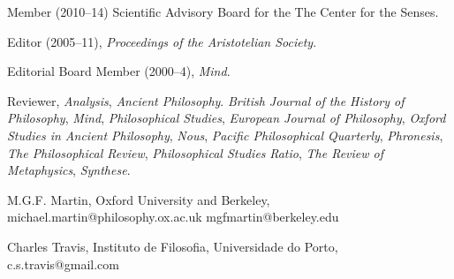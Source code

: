 \documentclass[11pt]{article}
\begin{document}
\ind Member (2010--14) Scientific Advisory Board for the The Center for the Senses.

\ind Editor (2005--11), \emph{Proceedings of the Aristotelian Society}.

\ind Editorial Board Member (2000--4), \emph{Mind}. 

\ind Reviewer, \emph{Analysis}, \emph{Ancient Philosophy}. \emph{British Journal of the History of Philosophy}, \emph{Mind}, \emph{Philosophical Studies}, \emph{European Journal of Philosophy}, \emph{Oxford Studies in Ancient Philosophy}, \emph{Nous}, \emph{Pacific Philosophical Quarterly}, \emph{Phronesis}, \emph{The Philosophical Review}, \emph{Philosophical Studies} \emph{Ratio}, \emph{The Review of Metaphysics}, \emph{Synthese}.


\medskip

\ind M.G.F. Martin, Oxford University and Berkeley, michael.martin@philosophy.ox.ac.uk mgfmartin@berkeley.edu

\ind Charles Travis, Instituto de Filosofia, Universidade do Porto, c.s.travis@gmail.com
\end{document}
